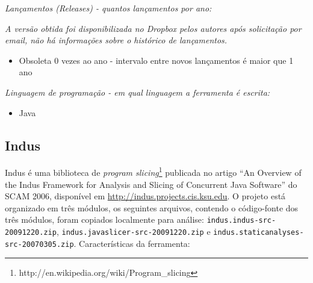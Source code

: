 \begin{description}

  \item {\it Lançamentos ({\it Releases}) - quantos lançamentos por ano:}

    {\it A versão obtida foi disponibilizada no Dropbox pelos autores após solicitação
    por email, não há informações sobre o histórico de lançamentos.}

    \begin{itemize}
      \item Obsoleta $0$ vezes ao ano - intervalo entre novos lançamentos é maior que 1 ano
    \end{itemize}

  \item {\it Linguagem de programação - em qual linguagem a ferramenta é escrita:}
    \begin{itemize}
      \item Java
    \end{itemize}

\end{description}

\subsection{Indus}

Indus é uma biblioteca de {\it program
slicing}\footnote{http://en.wikipedia.org/wiki/Program\_slicing} publicada no
artigo ``An Overview of the Indus Framework for Analysis and Slicing of
Concurrent Java Software'' do SCAM 2006, disponível em
\url{http://indus.projects.cis.ksu.edu}.  O projeto está organizado em três
módulos, os seguintes arquivos, contendo o código-fonte dos três módulos,
foram copiados localmente para análise:
\texttt{indus.indus-src-20091220.zip},
\texttt{indus.javaslicer-src-20091220.zip} e
\texttt{indus.staticanalyses-src-20070305.zip}. Características da ferramenta:

